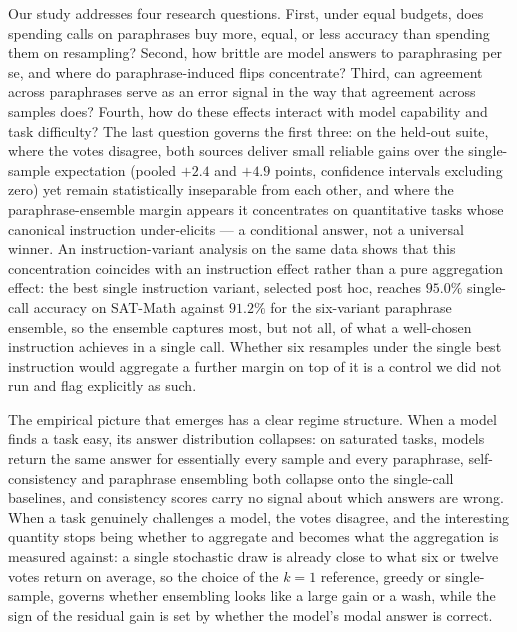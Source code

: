 Our study addresses four research questions. First, under equal budgets, does spending calls on paraphrases buy more, equal, or less accuracy than spending them on resampling? Second, how brittle are model answers to paraphrasing per se, and where do paraphrase-induced flips concentrate? Third, can agreement across paraphrases serve as an error signal in the way that agreement across samples does? Fourth, how do these effects interact with model capability and task difficulty? The last question governs the first three: on the held-out suite, where the votes disagree, both sources deliver small reliable gains over the single-sample expectation (pooled $+2.4$ and $+4.9$ points, confidence intervals excluding zero) yet remain statistically inseparable from each other, and where the paraphrase-ensemble margin appears it concentrates on quantitative tasks whose canonical instruction under-elicits --- a conditional answer, not a universal winner. An instruction-variant analysis on the same data shows that this concentration coincides with an instruction effect rather than a pure aggregation effect: the best single instruction variant, selected post hoc, reaches $95.0\%$ single-call accuracy on SAT-Math against $91.2\%$ for the six-variant paraphrase ensemble, so the ensemble captures most, but not all, of what a well-chosen instruction achieves in a single call. Whether six resamples under the single best instruction would aggregate a further margin on top of it is a control we did not run and flag explicitly as such.

The empirical picture that emerges has a clear regime structure. When a model finds a task easy, its answer distribution collapses: on saturated tasks, models return the same answer for essentially every sample and every paraphrase, self-consistency and paraphrase ensembling both collapse onto the single-call baselines, and consistency scores carry no signal about which answers are wrong. When a task genuinely challenges a model, the votes disagree, and the interesting quantity stops being whether to aggregate and becomes what the aggregation is measured against: a single stochastic draw is already close to what six or twelve votes return on average, so the choice of the $k{=}1$ reference, greedy or single-sample, governs whether ensembling looks like a large gain or a wash, while the sign of the residual gain is set by whether the model's modal answer is correct.

